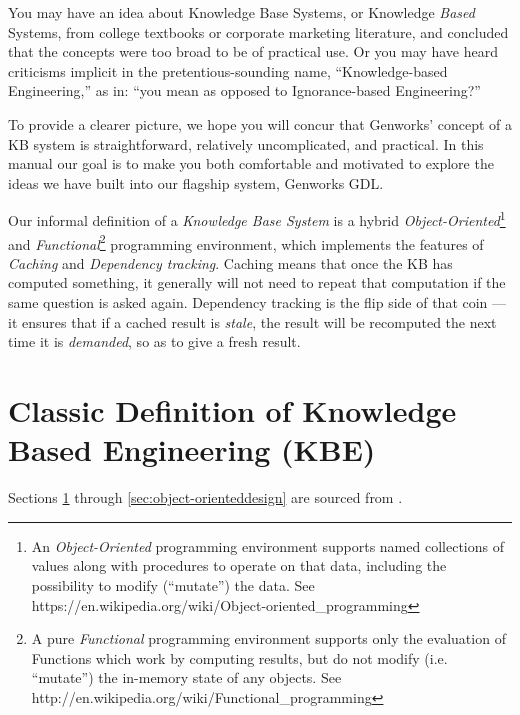 \documentclass [11pt]{book}
\begin{document}
\label{sec:knowledgebaseconceptsaccordingtogenworks}

You may have an idea about Knowledge Base Systems,
or Knowledge \emph{Based} Systems, from college textbooks or corporate marketing
literature, and concluded that the concepts were too broad to be of
practical use. Or you may have heard criticisms implicit in the
pretentious-sounding name, ``Knowledge-based Engineering,'' as in:
``you mean as opposed to Ignorance-based Engineering?'' 

To provide a clearer picture, we hope you will concur that Genworks'
concept of a KB system is straightforward, relatively uncomplicated,
and practical. In this manual our goal is to make you both comfortable
and motivated to explore the ideas we have built into our flagship
system, Genworks GDL.

Our informal definition of a \emph{Knowledge Base System} is a hybrid \emph{Object-Oriented}\footnote{An \emph{Object-Oriented} programming environment supports named collections
		  of values along with procedures to operate on that
		  data, including the possibility to
		  modify (``mutate'') the data. See
		  https://en.wikipedia.org/wiki/Object-oriented\_programming} and \emph{Functional}\footnote{A pure \emph{Functional} programming environment supports only the
evaluation of Functions which work by computing results, but do not
modify (i.e. ``mutate'') the in-memory state of any objects. See
http://en.wikipedia.org/wiki/Functional\_programming} programming environment, which implements the features of \emph{Caching} and \emph{Dependency tracking}. Caching means that once the KB has computed something, it
generally will not need to repeat that computation if the same
question is asked again. Dependency tracking is the flip side of that
coin --- it ensures that if a cached result is \emph{stale}, the result will be recomputed the next time it is \emph{demanded}, so as to give a fresh result.

\section{Classic Definition of Knowledge Based Engineering (KBE)}

\label{sec:classicdefinitionofknowledgebasedengineering(kbe)}

Sections 
\ref{sec:classicdefinitionofknowledgebasedengineering(kbe)} through 
\ref{sec:object-orienteddesign} are sourced from 
\cite{LaRocca}.
\end{document}
